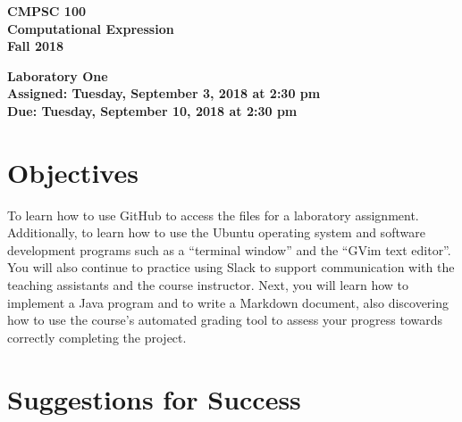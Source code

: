 \documentclass[11pt]{article}
\newcommand{\assignmentduedate}{September 10}
\newcommand{\assignmentassignedate}{September 3}
\newcommand{\assignmentnumber}{One}
\newcommand{\labyear}{2018}
\newcommand{\labday}{Tuesday}
\newcommand{\labtime}{2:30 pm}
\newcommand{\assigneddate}{Assigned: \labday, \assignmentassignedate, \labyear{} at \labtime{}}
\newcommand{\duedate}{Due: \labday, \assignmentduedate, \labyear{} at \labtime{}}
\newcommand{\labtitle}[1]
{
  \begin{center}
    \begin{center}
      \bf
      CMPSC 100\\Computational Expression\\
      Fall 2018\\
      \medskip
    \end{center}
    \bf
    #1
  \end{center}
}
\begin{document}
\thispagestyle{empty}

\labtitle{Laboratory \assignmentnumber{} \\ \assigneddate{} \\ \duedate{}}

\section*{Objectives}

To learn how to use GitHub to access the files for a laboratory assignment.
Additionally, to learn how to use the Ubuntu operating system and software
development programs such as a ``terminal window'' and the ``GVim text
editor''. You will also continue to practice using Slack to support
communication with the teaching assistants and the course instructor. Next, you
will learn how to implement a Java program and to write a Markdown document,
also discovering how to use the course's automated grading tool to assess your
progress towards correctly completing the project.

\section*{Suggestions for Success}
\end{document}

